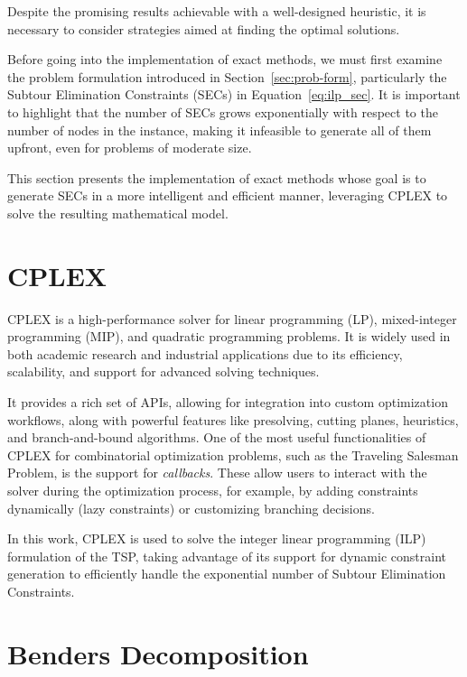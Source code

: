 \label{chap:exact-methods}
Despite the promising results achievable with a well-designed heuristic, it is necessary to consider strategies aimed at finding the optimal solutions.

Before going into the implementation of exact methods, we must first examine the problem formulation introduced in Section~\ref{sec:prob-form}, particularly the Subtour Elimination Constraints (SECs) in Equation~\ref{eq:ilp_sec}. It is important to highlight that the number of SECs grows exponentially with respect to the number of nodes in the instance, making it infeasible to generate all of them upfront, even for problems of moderate size.

This section presents the implementation of exact methods whose goal is to generate SECs in a more intelligent and efficient manner, leveraging CPLEX to solve the resulting mathematical model.

\section{CPLEX}

CPLEX is a high-performance solver for linear programming (LP), mixed-integer programming (MIP), and quadratic programming problems. It is widely used in both academic research and industrial applications due to its efficiency, scalability, and support for advanced solving techniques. \cite{cplex2023}

It provides a rich set of APIs, allowing for integration into custom optimization workflows, along with powerful features like presolving, cutting planes, heuristics, and branch-and-bound algorithms. One of the most useful functionalities of CPLEX for combinatorial optimization problems, such as the Traveling Salesman Problem, is the support for \emph{callbacks}. These allow users to interact with the solver during the optimization process, for example, by adding constraints dynamically (lazy constraints) or customizing branching decisions.

In this work, CPLEX is used to solve the integer linear programming (ILP) formulation of the TSP, taking advantage of its support for dynamic constraint generation to efficiently handle the exponential number of Subtour Elimination Constraints.

\section{Benders Decomposition}

